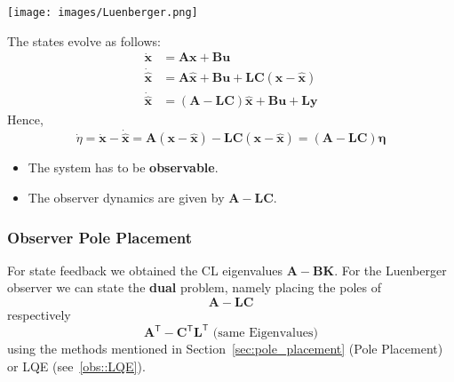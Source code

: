 \begin{center}
    \texttt{[image: images/Luenberger.png]}
\end{center}

\newpar{}


The states evolve as follows:
\begin{align*}
    \dot{\mathbf{x}}       & =\mathbf{Ax}+\mathbf{Bu}                                                         \\
    \dot{\hat{\textbf{x}}} & =\mathbf{A}\hat{\mathbf{x}}+\mathbf{Bu}+\mathbf{LC}(\mathbf{x}-\hat{\mathbf{x}}) \\
    \dot{\hat{\textbf{x}}} & =(\mathbf{A-LC})\hat{\mathbf{x}}+\mathbf{Bu}+\mathbf{Ly}
\end{align*}
Hence,
\begin{equation*}
    \dot{\eta}=\dot{\mathbf{x}}-\dot{\hat{\textbf{x}}}=\mathbf{A}(\mathbf{x}-\hat{\mathbf{x}})-\mathbf{LC}(\mathbf{x}-\hat{\mathbf{x}})=(\mathbf{A}-\mathbf{LC})\boldsymbol{\eta}
\end{equation*}


\begin{itemize}
    \item The system has to be \textbf{observable}.
    \item The observer dynamics are given by $\mathbf{A}-\mathbf{LC}$.
\end{itemize}

\subsubsection{Observer Pole Placement}
For state feedback we obtained the CL eigenvalues $\mathbf{A}-\mathbf{BK}$.
For the Luenberger observer we can state the \textbf{dual} problem, namely placing the poles of
\begin{equation*}
    \mathbf{A}-\mathbf{LC}
\end{equation*}
respectively
\begin{equation*}
    \mathbf{A}^{\mathsf{T}}-\mathbf{C}^{\mathsf{T}} \mathbf{L}^{\mathsf{T}}\text{ (same Eigenvalues)}
\end{equation*}
using the methods mentioned in Section~\ref{sec:pole_placement} (Pole Placement) or LQE (see~\ref{obs::LQE}).

\newpar{}

